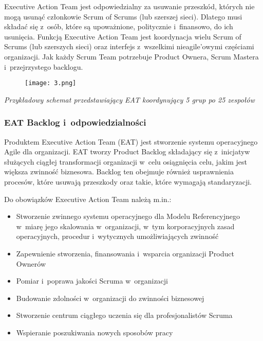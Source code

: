 \documentclass[12pt,a4paper,parskip=full]{scrartcl}
\begin{document}
Executive Action Team jest odpowiedzialny za usuwanie przeszkód, których nie mogą usunąć członkowie Scrum of Scrums (lub szerszej sieci). Dlatego musi składać się z~osób, które są upoważnione, politycznie i~finansowo, do ich usunięcia. Funkcją Executive Action Team jest koordynacja wielu Scrum of Scrums (lub szerszych sieci) oraz interfejs z~wszelkimi nieagile'owymi częściami organizacji. Jak każdy Scrum Team potrzebuje Product Ownera, Scrum Mastera i~przejrzystego backlogu.

\begin{figure}[H]
    \centering
    \texttt{[image: 3.png]}
    
\end{figure}


\emph{Przykładowy schemat przedstawiający EAT koordynujący 5 grup po 25 zespołów}

\subsubsection{EAT Backlog i~odpowiedzialności}\label{EAT-backlog-and-responsibilities}

Produktem Executive Action Team (EAT) jest stworzenie systemu operacyjnego Agile dla organizacji. EAT tworzy Product Backlog składający się z~inicjatyw służących ciągłej transformacji organizacji w~celu osiągnięcia celu, jakim jest większa zwinność biznesowa. Backlog ten obejmuje również usprawnienia procesów, które usuwają przeszkody oraz takie, które wymagają standaryzacji.

Do obowiązków Executive Action Team należą m.in.:

\begin{itemize}
\itemsep1pt\parskip0pt
\item
  Stworzenie zwinnego systemu operacyjnego dla Modelu Referencyjnego w~mia\-rę jego skalowania w~organizacji, w~tym korporacyjnych zasad operacyjnych, procedur i~wytycznych umożliwiających zwinność
\item
 Zapewnienie stworzenia, finansowania i~wsparcia organizacji Product Ownerów
\item
  Pomiar i~poprawa jakości Scruma w~organizacji
\item
  Budowanie zdolności w~organizacji do zwinności biznesowej
\item
  Stworzenie centrum ciągłego uczenia się dla profesjonalistów Scruma
\item
  Wspieranie poszukiwania nowych sposobów pracy
\end{itemize}
\end{document}
